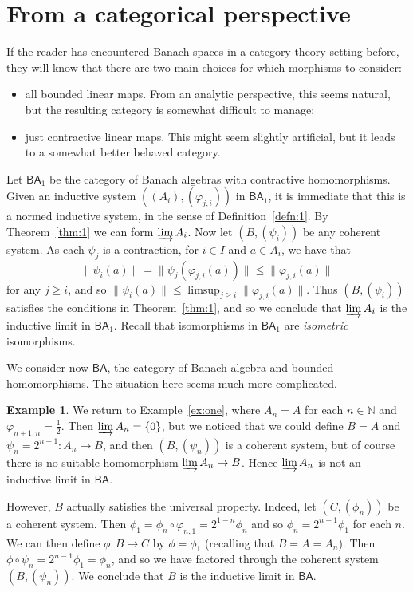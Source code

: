 \documentclass[a4paper,11pt]{article}
\newcommand{\indlim}{\varinjlim}
\newcommand{\ba}{\textsf{BA}}
\theoremstyle{definition}
\newtheorem{example}[lemma]{Example}
\begin{document}
\section{From a categorical perspective}

If the reader has encountered Banach spaces in a category theory setting before, they will know that
there are two main choices for which morphisms to consider:
\begin{itemize}
\item all bounded linear maps.  From an analytic perspective, this seems natural, but the resulting
category is somewhat difficult to manage;
\item just contractive linear maps.  This might seem slightly artificial, but it leads to a somewhat
better behaved category.
\end{itemize}

Let $\ba_1$ be the category of Banach algebras with contractive homomorphisms.  Given an inductive
system $((A_i), (\varphi_{j,i}))$ in $\ba_1$, it is immediate that this is a normed inductive
system, in the sense of Definition~\ref{defn:1}.  By Theorem~\ref{thm:1} we can form
$\indlim A_i$.  Now let $(B,(\psi_i))$ be any coherent system.
As each $\psi_j$ is a contraction, for $i\in I$ and $a\in A_i$, we have that
\[ \|\psi_i(a)\| = \|\psi_j(\varphi_{j,i}(a))\|
\leq \|\varphi_{j,i}(a)\| \]
for any $j\geq i$, and so $\|\psi_i(a)\| \leq \limsup_{j\geq i}\|\varphi_{j,i}(a)\|$.
Thus $(B,(\psi_i))$ satisfies the conditions in Theorem~\ref{thm:1}, and so we conclude that
$\indlim A_i$ is the inductive limit in $\ba_1$.  Recall that isomorphisms in $\ba_1$ are
\emph{isometric} isomorphisms.

We consider now $\ba$, the category of Banach algebra and bounded homomorphisms.  The situation here
seems much more complicated.

\begin{example}
We return to
Example~\ref{ex:one}, where $A_n=A$ for each $n\in\mathbb N$ and $\varphi_{n+1,n} = \frac12$.
Then $\indlim A_n = \{0\}$, but we noticed that we could define $B=A$ and $\psi_n =
2^{n-1}:A_n\rightarrow B$, and then $(B,(\psi_n))$ is a coherent system, but of course there is
no suitable homomorphism $\indlim A_n \rightarrow B$.  Hence $\indlim A_n$ is not an inductive
limit in $\ba$.

However, $B$ actually satisfies the universal property.  Indeed, let $(C,(\phi_n))$ be a coherent
system.  Then $\phi_1 = \phi_n \circ \varphi_{n,1} = 2^{1-n} \phi_n$ and so
$\phi_n = 2^{n-1} \phi_1$ for each $n$.  We can then define $\phi: B\rightarrow C$ by
$\phi = \phi_1$ (recalling that $B=A=A_n$).  Then $\phi\circ\psi_n = 2^{n-1}\phi_1
= \phi_n$, and so we have factored through the coherent system $(B,(\psi_n))$.  We conclude that
$B$ is the inductive limit in $\ba$.
\end{example}
\end{document}
